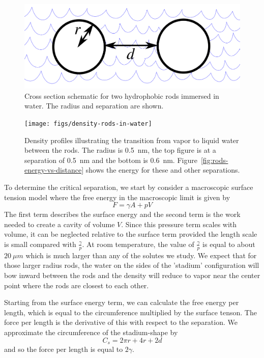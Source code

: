 \documentclass[letterpaper,twocolumn,amsmath,amssymb,prb]{revtex4-1}
\begin{document}
\begin{figure}
\begin{center}
\includegraphics[width=\columnwidth]{figs/rods-diagram}
\end{center}
\caption{ Cross section schematic for two hydrophobic rods immersed in water.
The radius and separation are shown.}
\label{fig:rods}
\end{figure}

\begin{figure}
\begin{center}
\texttt{[image: figs/density-rods-in-water]}
\end{center}
\caption{ Density profiles illustrating the transition from vapor 
to liquid water between the rods. The radius is 0.5~nm, the top figure is 
at a separation of 0.5~nm and the
bottom is 0.6~nm. Figure~\ref{fig:rods-energy-vs-distance} shows
the energy for these and other separations.}
\label{fig:density-rods}
\end{figure}

To determine the critical separation, we start by consider a macroscopic surface
tension model where the free energy in the macroscopic limit is given by 
\begin{equation}
F = \gamma A + pV
\end{equation}
The first term describes the surface energy and the second term
is the work needed to create a cavity of volume $V$. Since this pressure term
scales with volume, it can be neglected relative to the surface term provided
the length scale is small compared with $\frac{\gamma} p$. At room temperature,
the value of $\frac{\gamma} p$ is equal to about $20~\mu m$ which is
much larger than any of the solutes we study. We expect that for those
larger radius 
rods, the water on the sides of the 'stadium' configuration will bow inward 
between the rods and the density will reduce to vapor near the center
point where the rods are closest to each other.

Starting from the surface energy term, we can calculate the 
free energy per length, which is equal to the circumference multiplied 
by the surface tenson. The force per length is the derivative of this
with respect to the separation. 
We approximate the circumference of the stadium-shape by
\begin{equation}
C_{s} = 2\pi r +4r+2d
\end{equation}
and so the force per length is equal to $2\gamma$.
\end{document}
